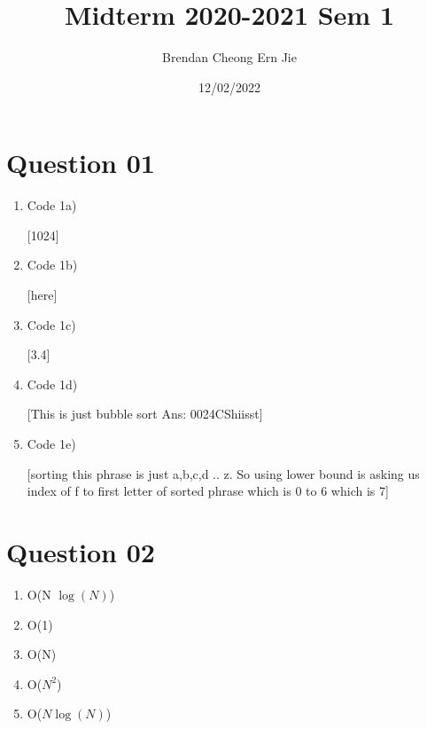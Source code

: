 \documentclass{article}
\title{Midterm 2020-2021 Sem 1}
\author{Brendan Cheong Ern Jie}
\date {12/02/2022}
\begin{document}
\maketitle

\section{Question 01}
\begin{enumerate}[label=(\alph*)]

\item Code 1a)

[1024]

\item Code 1b)

[here]

\item Code 1c)

[3.4]

\item Code 1d)

[This is just bubble sort
Ans: 0024CShiisst]

\item Code 1e)

[sorting this phrase is just a,b,c,d .. z. So using lower bound is asking us index of f to first letter of sorted phrase which is 0 to 6 which is 7]

\end{enumerate}

\section{Question 02}
\begin{enumerate}[label=(\alph*)]

\item O(N $\log(N)$)


\item O(1)

\item O(N)

\item O($N^2$)

\item O($N\log(N)$)

\end{enumerate}
\end{document}
